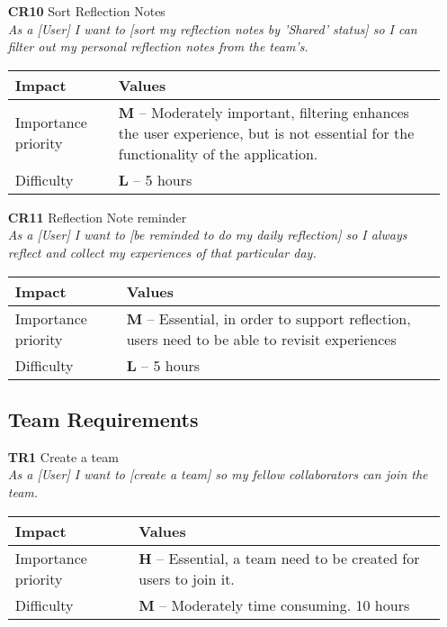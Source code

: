 \begin{itemize}
    \item[\textbf{CR10}] Sort Reflection Notes\\
        \textit{\small{As a [User] I want to [sort my reflection notes by 'Shared' status] so I can filter out my personal reflection notes from the team's.}}

        \begin{tabular}{| l | p{8cm} |}
            \hline
            \rowcolor[gray]{0.8}
            \textbf{Impact} & \textbf{Values} \\
            \hline
            Importance priority & \textbf{M} -- Moderately important, filtering enhances the user experience, but is not essential for the functionality of the application.\\
            Difficulty & \textbf{L} -- 5 hours\\
            \hline
        \end{tabular}
    \vspace{0.5cm}

    \item[\textbf{CR11}] Reflection Note reminder\\
        \textit{\small{As a [User] I want to [be reminded to do my daily reflection] so I always reflect and collect my experiences of that particular day.}}

        \begin{tabular}{| l | p{8cm} |}
            \hline
            \rowcolor[gray]{0.8}
            \textbf{Impact} & \textbf{Values} \\
            \hline
            Importance priority & \textbf{M} -- Essential, in order to support reflection, users need to be able to revisit experiences\\
            Difficulty & \textbf{L} -- 5 hours\\
            \hline
        \end{tabular}
    \vspace{0.5cm}

\subsection{Team Requirements}
    \item[\textbf{TR1}] Create a team\\
        \textit{\small{As a [User] I want to [create a team] so my fellow collaborators can join the team.}}

        \begin{tabular}{| l | p{8cm} |}
            \hline
            \rowcolor[gray]{0.8}
            \textbf{Impact} & \textbf{Values} \\
            \hline
            Importance priority & \textbf{H} -- Essential, a team need to be created for users to join it.\\
            Difficulty & \textbf{M} -- Moderately time consuming. 10 hours\\
            \hline
        \end{tabular}
    \vspace{0.5cm}


\end{itemize}
